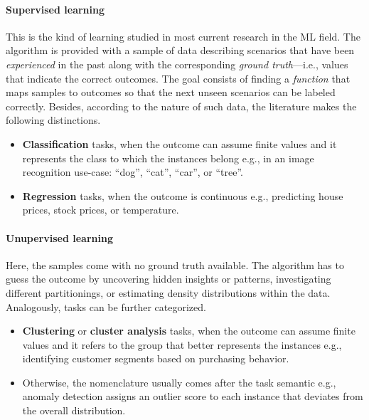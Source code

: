 \documentclass[a4paper,12pt,times,numbered,print,index]{Classes/PhDThesisPSnPDF}
\begin{document}
\paragraph{Supervised learning} This is the kind of learning studied in most current research in the ML field. The algorithm is provided with a sample of data describing scenarios that have been \textit{experienced} in the past along with the corresponding \textit{ground truth}---i.e., values that indicate the correct outcomes.
The goal consists of finding a \textit{function} that maps samples to outcomes so that the next unseen scenarios can be labeled correctly.
Besides, according to the nature of such data, the literature makes the following distinctions.
\begin{itemize}
    \item \textbf{Classification} tasks, when the outcome can assume finite values and it represents the class to which the instances belong e.g., in an image recognition use-case: ``dog'', ``cat'', ``car'', or ``tree''.
    \item \textbf{Regression} tasks, when the outcome is continuous e.g., predicting house prices, stock prices, or temperature.
\end{itemize}

\paragraph{Unupervised learning}
Here, the samples come with no ground truth available.
The algorithm has to guess the outcome by uncovering hidden insights or patterns, investigating different partitionings, or estimating density distributions within the data.
Analogously, tasks can be further categorized.
\begin{itemize}
    \item \textbf{Clustering} or \textbf{cluster analysis} tasks, when the outcome can assume finite values and it refers to the group that better represents the instances e.g., identifying customer segments based on purchasing behavior.
    \item Otherwise, the nomenclature usually comes after the task semantic e.g., anomaly detection assigns an outlier score to each instance that deviates from the overall distribution.
\end{itemize}
\end{document}
